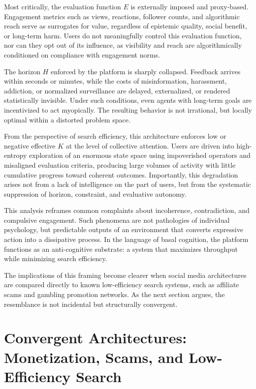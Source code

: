 \documentclass[12pt]{article}
\begin{document}
Most critically, the evaluation function \( E \) is externally imposed and proxy-based. Engagement metrics such as views, reactions, follower counts, and algorithmic reach serve as surrogates for value, regardless of epistemic quality, social benefit, or long-term harm. Users do not meaningfully control this evaluation function, nor can they opt out of its influence, as visibility and reach are algorithmically conditioned on compliance with engagement norms.

The horizon \( H \) enforced by the platform is sharply collapsed. Feedback arrives within seconds or minutes, while the costs of misinformation, harassment, addiction, or normalized surveillance are delayed, externalized, or rendered statistically invisible. Under such conditions, even agents with long-term goals are incentivized to act myopically. The resulting behavior is not irrational, but locally optimal within a distorted problem space.

From the perspective of search efficiency, this architecture enforces low or negative effective \( K \) at the level of collective attention. Users are driven into high-entropy exploration of an enormous state space using impoverished operators and misaligned evaluation criteria, producing large volumes of activity with little cumulative progress toward coherent outcomes. Importantly, this degradation arises not from a lack of intelligence on the part of users, but from the systematic suppression of horizon, constraint, and evaluative autonomy.

This analysis reframes common complaints about incoherence, contradiction, and compulsive engagement. Such phenomena are not pathologies of individual psychology, but predictable outputs of an environment that converts expressive action into a dissipative process. In the language of basal cognition, the platform functions as an anti-cognitive substrate: a system that maximizes throughput while minimizing search efficiency.

The implications of this framing become clearer when social media architectures are compared directly to known low-efficiency search systems, such as affiliate scams and gambling promotion networks. As the next section argues, the resemblance is not incidental but structurally convergent.

\section{Convergent Architectures: Monetization, Scams, and Low-Efficiency Search}
\end{document}

